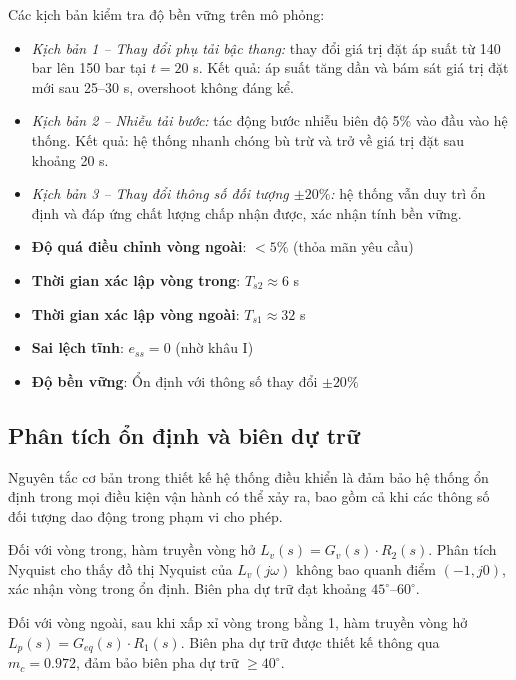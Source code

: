 \documentclass[../main.tex]{subfiles}
\begin{document}
Các kịch bản kiểm tra độ bền vững trên mô phỏng:

\begin{itemize}
    \item \textit{Kịch bản 1 -- Thay đổi phụ tải bậc thang:} thay đổi giá trị đặt áp suất từ 140 bar lên 150 bar tại $t = 20$ s. Kết quả: áp suất tăng dần và bám sát giá trị đặt mới sau 25--30 s, overshoot không đáng kể.
    \item \textit{Kịch bản 2 -- Nhiễu tải bước:} tác động bước nhiễu biên độ 5\% vào đầu vào hệ thống. Kết quả: hệ thống nhanh chóng bù trừ và trở về giá trị đặt sau khoảng 20 s.
    \item \textit{Kịch bản 3 -- Thay đổi thông số đối tượng $\pm 20\%$:} hệ thống vẫn duy trì ổn định và đáp ứng chất lượng chấp nhận được, xác nhận tính bền vững.
\end{itemize}
\begin{tcolorbox}[colback=green!5!white, colframe=green!75!black, title={Kết quả mô phỏng chính}]
\begin{itemize}
    \item \textbf{Độ quá điều chỉnh vòng ngoài}: $< 5\%$ (thỏa mãn yêu cầu)
    \item \textbf{Thời gian xác lập vòng trong}: $T_{s2} \approx 6$ s
    \item \textbf{Thời gian xác lập vòng ngoài}: $T_{s1} \approx 32$ s
    \item \textbf{Sai lệch tĩnh}: $e_{ss} = 0$ (nhờ khâu I)
    \item \textbf{Độ bền vững}: Ổn định với thông số thay đổi $\pm20\%$
\end{itemize}
\end{tcolorbox}

\subsection{Phân tích ổn định và biên dự trữ}

Nguyên tắc cơ bản trong thiết kế hệ thống điều khiển là đảm bảo hệ thống ổn định trong mọi điều kiện vận hành có thể xảy ra, bao gồm cả khi các thông số đối tượng dao động trong phạm vi cho phép.

Đối với vòng trong, hàm truyền vòng hở $L_v(s) = G_v(s) \cdot R_2(s)$. Phân tích Nyquist cho thấy đồ thị Nyquist của $L_v(j\omega)$ không bao quanh điểm $(-1, j0)$, xác nhận vòng trong ổn định. Biên pha dự trữ đạt khoảng $45^\circ$--$60^\circ$.

Đối với vòng ngoài, sau khi xấp xỉ vòng trong bằng 1, hàm truyền vòng hở $L_p(s) = G_{eq}(s) \cdot R_1(s)$. Biên pha dự trữ được thiết kế thông qua $m_c = 0.972$, đảm bảo biên pha dự trữ $\geq 40^\circ$.
\end{document}
